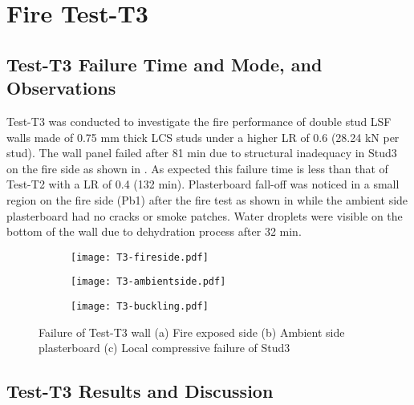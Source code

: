 \section{Fire Test-T3}
\subsection{Test-T3 Failure Time and Mode, and Observations}

Test-T3 was conducted to investigate the fire performance of double stud LSF walls made of 0.75 mm thick LCS studs under a higher LR of 0.6 (28.24 kN per stud). The wall panel failed after 81 min due to structural inadequacy in Stud3 on the fire side as shown in . As expected this failure time is less than that of Test-T2 with a LR of 0.4 (132 min). Plasterboard fall-off was noticed in a small region on the fire side (Pb1) after the fire test as shown in  while the ambient side plasterboard had no cracks or smoke patches. Water droplets were visible on the bottom of the wall due to dehydration process after 32 min.
\begin{figure}[!htbp]
	\centering
	\begin{subfigure}[b]{0.4\textwidth}
		\centering
		\texttt{[image: T3-fireside.pdf]}
		\caption{}
		\label{subfig:T3-fireside}
	\end{subfigure}
	\begin{subfigure}[b]{0.4\textwidth}
		\centering
		\texttt{[image: T3-ambientside.pdf]}
		\caption{}
		\label{subfig:T3-ambientside}
	\end{subfigure}
	\begin{subfigure}[b]{0.4\textwidth}
		\centering
		\texttt{[image: T3-buckling.pdf]}
		\caption{}
		\label{subfig:T3-buckling}
	\end{subfigure}
	   \caption{Failure of Test-T3 wall (a) Fire exposed side (b) Ambient side plasterboard (c) Local compressive failure of Stud3}
	   \label{fig:T3-failure}
\end{figure}

\subsection{Test-T3 Results and Discussion}

